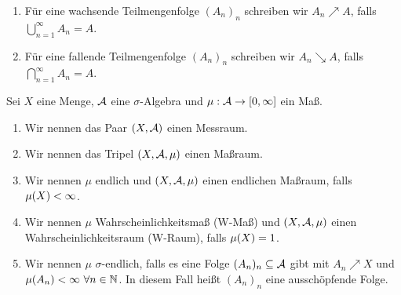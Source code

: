 \begin{notation}
    \theoremescape
    \begin{enumerate}
        \item Für eine wachsende Teilmengenfolge $(A_n)_n$ schreiben wir $A_n \nearrow A$, falls $\bigcup_{n=1}^{\infty} A_n = A$.
        \item Für eine fallende Teilmengenfolge $(A_n)_n$ schreiben wir $A_n \searrow A$, falls $\bigcap_{n=1}^{\infty} A_n = A$.
    \end{enumerate}
\end{notation}

\begin{definition}
    Sei $X$ eine Menge, $\mathcal{A}$ eine $\sigma$-Algebra und $\mu: \mathcal{A}\to\left[0,\infty\right]$ ein Maß.
    \begin{enumerate}
        \item Wir nennen das Paar $\left(X, \mathcal{A}\right)$ einen Messraum.
        \item Wir nennen das Tripel $\left(X, \mathcal{A}, \mu\right)$ einen Maßraum.
        \item Wir nennen $\mu$ endlich und $\left(X, \mathcal{A}, \mu\right)$ einen endlichen Maßraum, falls $\mu\of{X} < \infty$.
        \item Wir nennen $\mu$ Wahrscheinlichkeitsmaß (W-Maß) und $\left(X, \mathcal{A}, \mu\right)$ einen Wahrscheinlichkeitsraum (W-Raum), falls $\mu\of{X} = 1$.
        \item Wir nennen $\mu$ $\sigma$-endlich, falls es eine Folge $(A_n)_n \subseteq \mathcal{A}$ gibt mit $A_n \nearrow X$ und\\$\mu\of{A_n} < \infty~\forall n\in\N$. In diesem Fall heißt $(A_n)_n$ eine ausschöpfende Folge.
    \end{enumerate}
\end{definition}

